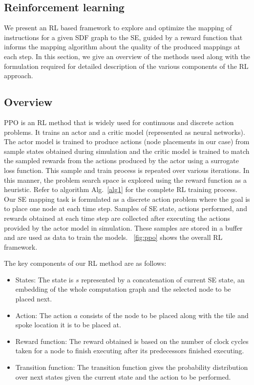\subsection{Reinforcement learning}

We present an RL based framework to explore and optimize the mapping of instructions for a given SDF graph to the SE, guided by a reward function that informs the mapping algorithm about the quality of the produced mappings at each step. In this section, we give an overview of the methods used along with the formulation required for detailed description of the various components of the RL approach.

\subsection{Overview}
PPO \cite{schulman2017proximal} is an RL method that is  widely used for continuous and discrete action problems. 
It trains an actor and a critic model (represented as neural networks).
The actor model is trained to produce actions (node placements in our case) from sample states obtained during simulation and the critic model is trained to match the sampled rewards from the actions produced by the actor using a surrogate loss function. 
This sample and train process is repeated over various iterations. 
In this manner, the problem search space is explored using the reward function as a heuristic.
Refer to algorithm Alg.~\ref{alg1} for the complete RL training process.
Our SE mapping task is formulated as a discrete action problem where the goal is to place one node at each time step. 
Samples of SE state, actions performed, and rewards obtained at each time step are collected after executing the actions provided by the actor model in simulation. 
These samples are stored in a buffer and are used as data to train the models.
\figurename~\ref{fig:ppo} shows the overall RL framework. 

The key components of our RL method are as follows:
\begin{itemize}
  \item States: The state is $s$ represented by a concatenation of current SE state, an embedding of the whole computation graph and the selected node to be placed next.
  \item Action: The action $a$ consists of the node to be placed along with the tile and spoke location it is to be placed at.
  \item Reward function: The reward obtained is based on the number of clock cycles taken for a node to finish executing after its predecessors finished executing.
  \item Transition function: The transition function gives the probability distribution over next states given the current state and the action to be performed.
\end{itemize}

